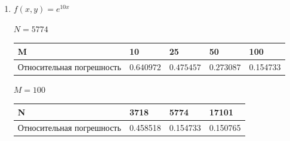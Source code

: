 \documentclass[14pt, a4paper]{extarticle}
\begin{document}
\begin{enumerate}
			\item \( f(x, y) = e^{10x} \)
			
			\(N = 5774\)
			\begin{table}[H]
				\centering
				\begin{tabular}{|P{5cm}|P{2.5cm}|P{2.5cm}|P{2.5cm}|P{2.5cm}|}
					\hline
					M & 10 & 25 & 50 & 100 \\ \hline
					Относительная погрешность & $0.640972$ & $0.475457$ & $0.273087$ & 0.154733\\ \hline
				\end{tabular}
			\end{table}
			
			\(M = 100\)
			\begin{table}[H]
				\centering
				\begin{tabular}{|P{5cm}|P{2.5cm}|P{2.5cm}|P{2.5cm}|}
					\hline
					N & 3718 & 5774 & 17101 \\ \hline
					Относительная погрешность & 0.458518 & 0.154733 & 0.150765\\ \hline
				\end{tabular}
			\end{table}
			

\end{enumerate}
\end{document}
